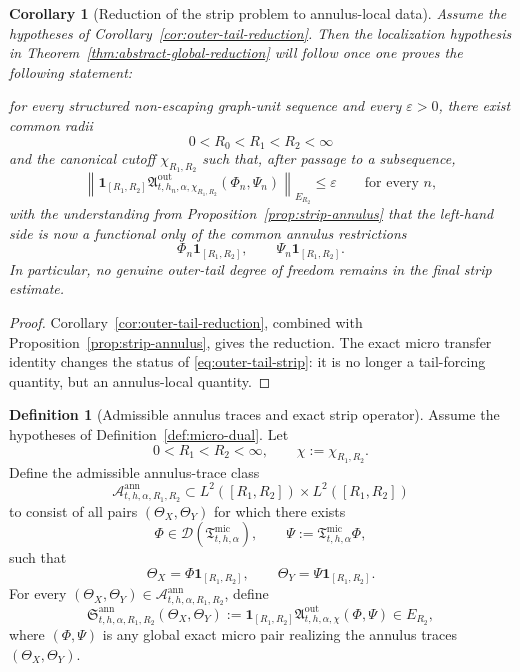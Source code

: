 \documentclass[11pt,a4paper]{amsart}
\theoremstyle{plain}
\newtheorem{corollary}[theorem]{Corollary}
\theoremstyle{definition}
\newtheorem{definition}[theorem]{Definition}
\theoremstyle{remark}
\newcommand{\one}{\mathbf 1}
\begin{document}
\begin{corollary}[Reduction of the strip problem to annulus-local data]
\label{cor:strip-annulus}
Assume the hypotheses of Corollary~\ref{cor:outer-tail-reduction}. Then the localization hypothesis
in Theorem~\ref{thm:abstract-global-reduction} will follow once one proves the following statement:

\smallskip
\noindent
for every structured non-escaping graph-unit sequence and every \(\varepsilon>0\), there exist
common radii
\[
0<R_0<R_1<R_2<\infty
\]
and the canonical cutoff \(\chi_{R_1,R_2}\) such that, after passage to a subsequence,
\begin{equation}\label{eq:strip-annulus-small}
\left\|
\one_{[R_1,R_2]}
\mathfrak A_{t,h_n,\alpha,\chi_{R_1,R_2}}^{\mathrm{out}}(\Phi_n,\Psi_n)
\right\|_{E_{R_2}}
\le
\varepsilon
\qquad\text{for every }n,
\end{equation}
with the understanding from Proposition~\ref{prop:strip-annulus} that the left-hand side is now a
functional only of the common annulus restrictions
\[
\Phi_n\one_{[R_1,R_2]},
\qquad
\Psi_n\one_{[R_1,R_2]}.
\]
In particular, no genuine outer-tail degree of freedom remains in the final strip estimate.
\end{corollary}

\begin{proof}
Corollary~\ref{cor:outer-tail-reduction}, combined with
Proposition~\ref{prop:strip-annulus}, gives the reduction.  The exact micro transfer identity
changes the status of \eqref{eq:outer-tail-strip}: it is no longer a tail-forcing quantity, but an
annulus-local quantity.
\end{proof}

\begin{definition}[Admissible annulus traces and exact strip operator]
\label{def:annulus-strip-op}
Assume the hypotheses of Definition~\ref{def:micro-dual}. Let
\[
0<R_1<R_2<\infty,
\qquad
\chi:=\chi_{R_1,R_2}.
\]
Define the admissible annulus-trace class
\[
\mathcal A_{t,h,\alpha,R_1,R_2}^{\mathrm{ann}}
\subset
L^2([R_1,R_2])\times L^2([R_1,R_2])
\]
to consist of all pairs \((\Theta_X,\Theta_Y)\) for which there exists
\[
\Phi\in\mathcal D(\mathfrak T_{t,h,\alpha}^{\mathrm{mic}}),
\qquad
\Psi:=\mathfrak T_{t,h,\alpha}^{\mathrm{mic}}\Phi,
\]
such that
\[
\Theta_X=\Phi\one_{[R_1,R_2]},
\qquad
\Theta_Y=\Psi\one_{[R_1,R_2]}.
\]
For every \((\Theta_X,\Theta_Y)\in \mathcal A_{t,h,\alpha,R_1,R_2}^{\mathrm{ann}}\), define
\begin{equation}\label{eq:annulus-strip-op}
\mathfrak S_{t,h,\alpha,R_1,R_2}^{\mathrm{ann}}(\Theta_X,\Theta_Y)
:=
\one_{[R_1,R_2]}
\mathfrak A_{t,h,\alpha,\chi}^{\mathrm{out}}(\Phi,\Psi)
\in E_{R_2},
\end{equation}
where \((\Phi,\Psi)\) is any global exact micro pair realizing the annulus traces
\((\Theta_X,\Theta_Y)\).
\end{definition}
\end{document}
